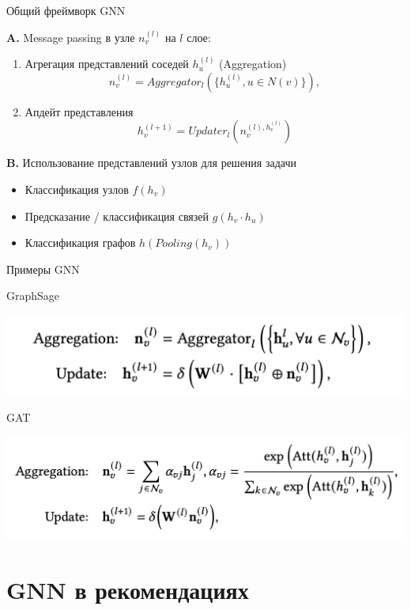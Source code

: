 \documentclass[11pt,aspectratio=169,handout]{beamer}
\begin{document}
\begin{frame}{Общий фреймворк GNN \cite{GNNSURVEY}}

{\bf A.} Message passing в узле $n_v^{(l)}$ на $l$ слое:
\begin{enumerate}
\item Агрегация представлений соседей $h_u^{(l)}$ (Aggregation)
\[
n_v^{(l)} = Aggregator_l(\{h_u^{(l)}, u \in N(v)\}), 
\]
\item Апдейт представления
\[
h_v^{(l+1)} = Updater_l(n_v^{(l), h_v^{(l)} })
\]
\end{enumerate}

{\bf B.} Использование представлений узлов для решения задачи
\begin{itemize}
\item Классификация узлов $f(h_v)$
\item Предсказание / классификация связей $g(h_v \cdot h_u)$
\item Классификация графов $h(Pooling(h_v))$
\end{itemize}

\end{frame}

\begin{frame}{Примеры GNN}

GraphSage

\includegraphics[scale=0.4]{images/graphsage.png}

GAT

\includegraphics[scale=0.4]{images/gat.png}

\end{frame}

\section{GNN в рекомендациях}
\end{document}
